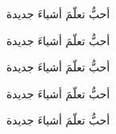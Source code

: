 ﻿\documentclass{article}
\begin{document}
{\tiny أحبُّ تعلّمَ أشياءَ جديدة}\par
{\small أحبُّ تعلّمَ أشياءَ جديدة}\par
{\normalsize أحبُّ تعلّمَ أشياءَ جديدة}\par
{\large أحبُّ تعلّمَ أشياءَ جديدة}\par
{\Huge أحبُّ تعلّمَ أشياءَ جديدة}\par
\end{document}
